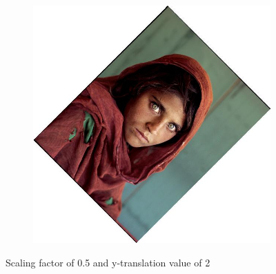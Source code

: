 \documentclass{article}
\begin{document}
\begin{figure}[H]
\begin{subfigure}{.3\textwidth}
    \end{subfigure}
    \begin{subfigure}{.3\textwidth}
        \centering
        \includegraphics[scale=0.04]{q1/output/similar_0.5_2_2.jpg}
    \end{subfigure}
    \caption{Scaling factor of 0.5 and y-translation value of 2}
\end{figure}
\end{document}
